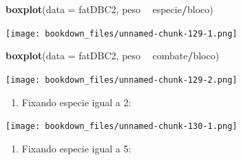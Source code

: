 \documentclass[
]{article}
\newenvironment{Shaded}{\begin{snugshade}}{\end{snugshade}}
\newcommand{\DataTypeTok}[1]{\textcolor[rgb]{0.13,0.29,0.53}{#1}}
\newcommand{\DecValTok}[1]{\textcolor[rgb]{0.00,0.00,0.81}{#1}}
\newcommand{\KeywordTok}[1]{\textcolor[rgb]{0.13,0.29,0.53}{\textbf{#1}}}
\newcommand{\NormalTok}[1]{#1}
\newcommand{\OperatorTok}[1]{\textcolor[rgb]{0.81,0.36,0.00}{\textbf{#1}}}
\newcommand{\StringTok}[1]{\textcolor[rgb]{0.31,0.60,0.02}{#1}}
\providecommand{\tightlist}{%
  \setlength{\itemsep}{0pt}\setlength{\parskip}{0pt}}
\begin{document}
\begin{Shaded}
\begin{Highlighting}[]
\KeywordTok{boxplot}\NormalTok{(}\DataTypeTok{data =}\NormalTok{ fatDBC2, peso }\OperatorTok{~}\StringTok{ }\NormalTok{especie}\OperatorTok{/}\NormalTok{bloco)}
\end{Highlighting}
\end{Shaded}

\texttt{[image: bookdown\_files/unnamed-chunk-129-1.png]}

\begin{Shaded}
\begin{Highlighting}[]
\KeywordTok{boxplot}\NormalTok{(}\DataTypeTok{data =}\NormalTok{ fatDBC2, peso }\OperatorTok{~}\StringTok{ }\NormalTok{combate}\OperatorTok{/}\NormalTok{bloco)}
\end{Highlighting}
\end{Shaded}

\texttt{[image: bookdown\_files/unnamed-chunk-129-2.png]}

\begin{enumerate}
\def\labelenumi{\arabic{enumi}.}
\setcounter{enumi}{4}
\tightlist
\item
  Fixando especie igual a 2:
\end{enumerate}

\begin{Shaded}
\end{Shaded}

\texttt{[image: bookdown\_files/unnamed-chunk-130-1.png]}

\begin{enumerate}
\def\labelenumi{\arabic{enumi}.}
\setcounter{enumi}{5}
\tightlist
\item
  Fixando especie igual a 5:
\end{enumerate}

\begin{Shaded}
\end{Shaded}
\end{document}
